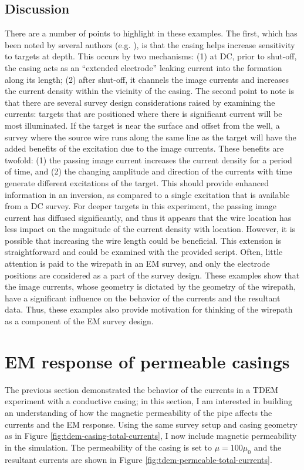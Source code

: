 \subsection{Discussion}
There are a number of points to highlight in these examples. The first, which has been noted by several authors (e.g. \cite{Schenkel1994, Hoversten2015}), is that the casing helps increase sensitivity to targets at depth. This occurs by two mechanisms: (1) at DC, prior to shut-off, the casing acts as an ``extended electrode'' leaking current into the formation along its length; (2) after shut-off, it channels the image currents and increases the current density within the vicinity of the casing. The second point to note is that there are several survey design considerations raised by examining the currents: targets that are positioned where there is significant current will be most illuminated. If the target is near the surface and offset from the well, a survey where the source wire runs along the same line as the target will have the added benefits of the excitation due to the image currents. These benefits are twofold: (1) the passing image current increases the current density for a period of time, and (2) the changing amplitude and direction of the currents with time generate different excitations of the target. This should provide enhanced information in an inversion, as compared to a single excitation that is available from a DC survey. For deeper targets in this experiment, the passing image current has diffused significantly, and thus it appears that the wire location has less impact on the magnitude of the current density with location. However, it is possible that increasing the wire length could be beneficial. This extension is straightforward and could be examined with the provided script. Often, little attention is paid to the wirepath in an EM survey, and only the electrode positions are considered as a part of the survey design. These examples show that the image currents, whose geometry is dictated by the geometry of the wirepath, have a significant influence on the behavior of the currents and the resultant data. Thus, these examples also provide motivation for thinking of the wirepath as a component of the EM survey design.


\section{EM response of permeable casings}
\label{sec:permeable-casing}

The previous section demonstrated the behavior of the currents in a TDEM experiment with a conductive casing; in this section, I am interested in building an understanding of how the magnetic permeability of the pipe affects the currents and the EM response. Using the same survey setup and casing geometry as in Figure \ref{fig:tdem-casing-total-currents}, I now include magnetic permeability in the simulation. The  permeability of the casing is set to $\mu = 100\mu_0$ and the resultant currents are shown in Figure \ref{fig:tdem-permeable-total-currents}.



